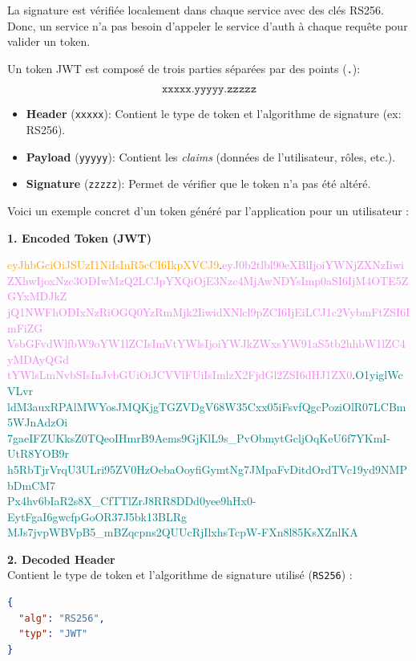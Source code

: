 \documentclass[11pt,a4paper]{article}
\begin{document}
La signature est v\'erifi\'ee localement dans chaque service avec des cl\'es RS256.
Donc, un service n'a pas besoin d'appeler le service d'auth \`a chaque requ\^ete pour valider un token.

Un token JWT est composé de trois parties séparées par des points (\texttt{.}):

\[ \texttt{xxxxx.yyyyy.zzzzz} \]

\begin{itemize}
  \item \textbf{Header} (\texttt{xxxxx}): Contient le type de token et l'algorithme de signature (ex: RS256).
  \item \textbf{Payload} (\texttt{yyyyy}): Contient les \textit{claims} (données de l'utilisateur, rôles, etc.).
  \item \textbf{Signature} (\texttt{zzzzz}): Permet de vérifier que le token n'a pas été altéré.
\end{itemize}

Voici un exemple concret d'un token généré par l'application pour un utilisateur :

\newpage

\vspace{0.3cm}
\noindent\textbf{1. Encoded Token (JWT)}
\begin{flushleft}
\ttfamily\small
\textcolor{orange}{eyJhbGciOiJSUzI1NiIsInR5cCI6IkpXVCJ9}.\textcolor{violet}{eyJ0b2tlbl90eXBlIjoiYWNjZXNzIiwi\\
ZXhwIjoxNzc3ODIwMzQ2LCJpYXQiOjE3Nzc4MjAwNDYsImp0aSI6IjM4OTE5ZGYxMDJkZ\\
jQ1NWFhODIxNzRiOGQ0YzRmMjk2IiwidXNlcl9pZCI6IjEiLCJ1c2VybmFtZSI6ImFiZG\\
VsbGFvdWlfbW9oYW1lZCIsImVtYWlsIjoiYWJkZWxsYW91aS5tb2hhbW1lZC4yMDAyQGd\\
tYWlsLmNvbSIsInJvbGUiOiJCVVlFUiIsImlzX2FjdGl2ZSI6dHJ1ZX0}.\textcolor{teal}{O1yiglWcVLvr\\
ldM3auxRPAlMWYosJMQKjgTGZVDgV68W35Cxx05iFsvfQgcPoziOlR07LCBm5WJnAdzOi\\
7gaeIFZUKksZ0TQeoIHmrB9Aems9GjKlL9s\_PvObmytGcljOqKeU6f7YKmI-UtR8YOB9r\\
h5RbTjrVrqU3ULri95ZV0HzOebaOoyfiGymtNg7JMpaFvDitdOrdTVc19yd9NMPbDmCM7\\
Px4hv6bIaR2s8X\_CfTTlZrJ8RR8DDd0yee9hHx0-EytFgaI6gwcfpGoOR37J5bk13BLRg\\
MJs7jvpWBVpB5\_mBZqcpns2QUUcRjIlxhsTcpW-FXn8l85KsXZnlKA}
\end{flushleft}

\noindent\textbf{2. Decoded Header} \\
Contient le type de token et l'algorithme de signature utilisé (\texttt{RS256}) :
\begin{lstlisting}[language=json]
{
  "alg": "RS256",
  "typ": "JWT"
}
\end{lstlisting}
\end{document}
